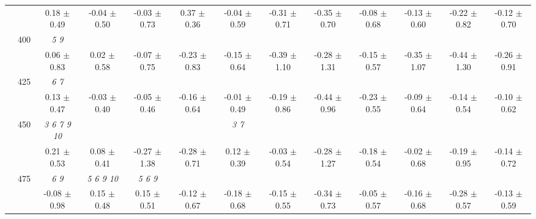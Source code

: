 \begin{table}[h]
{\begin{tabular}{
        ccccccccccccc}
 & & \cellcolor[HTML]{EFEFEF} 0.18 $\pm$ 0.49& \cellcolor[HTML]{EFEFEF} -0.04 $\pm$ 0.50& \cellcolor[HTML]{EFEFEF} -0.03 $\pm$ 0.73& \cellcolor[HTML]{EFEFEF} 0.37 $\pm$ 0.36& \cellcolor[HTML]{EFEFEF} -0.04 $\pm$ 0.59& \cellcolor[HTML]{EFEFEF} -0.31 $\pm$ 0.71& \cellcolor[HTML]{EFEFEF} -0.35 $\pm$ 0.70& \cellcolor[HTML]{EFEFEF} -0.08 $\pm$ 0.68& \cellcolor[HTML]{EFEFEF} -0.13 $\pm$ 0.60& \cellcolor[HTML]{EFEFEF} -0.22 $\pm$ 0.82& \cellcolor[HTML]{EFEFEF} -0.12 $\pm$ 0.70 \\ 
 & \multirow{2}{*}{400}& \textit{ 5 9 }& & & & & & & & & &  \\ 
 & & 0.06 $\pm$ 0.83& 0.02 $\pm$ 0.58& -0.07 $\pm$ 0.75& -0.23 $\pm$ 0.83& -0.15 $\pm$ 0.64& -0.39 $\pm$ 1.10& -0.28 $\pm$ 1.31& -0.15 $\pm$ 0.57& -0.35 $\pm$ 1.07& -0.44 $\pm$ 1.30& -0.26 $\pm$ 0.91 \\ 
 & \multirow{2}{*}{425}& \cellcolor[HTML]{EFEFEF} \textit{ 6 7 }& \cellcolor[HTML]{EFEFEF} & \cellcolor[HTML]{EFEFEF} & \cellcolor[HTML]{EFEFEF} & \cellcolor[HTML]{EFEFEF} & \cellcolor[HTML]{EFEFEF} & \cellcolor[HTML]{EFEFEF} & \cellcolor[HTML]{EFEFEF} & \cellcolor[HTML]{EFEFEF} & \cellcolor[HTML]{EFEFEF} & \cellcolor[HTML]{EFEFEF}  \\ 
 & & \cellcolor[HTML]{EFEFEF} 0.13 $\pm$ 0.47& \cellcolor[HTML]{EFEFEF} -0.03 $\pm$ 0.40& \cellcolor[HTML]{EFEFEF} -0.05 $\pm$ 0.46& \cellcolor[HTML]{EFEFEF} -0.16 $\pm$ 0.64& \cellcolor[HTML]{EFEFEF} -0.01 $\pm$ 0.49& \cellcolor[HTML]{EFEFEF} -0.19 $\pm$ 0.86& \cellcolor[HTML]{EFEFEF} -0.44 $\pm$ 0.96& \cellcolor[HTML]{EFEFEF} -0.23 $\pm$ 0.55& \cellcolor[HTML]{EFEFEF} -0.09 $\pm$ 0.64& \cellcolor[HTML]{EFEFEF} -0.14 $\pm$ 0.54& \cellcolor[HTML]{EFEFEF} -0.10 $\pm$ 0.62 \\ 
 & \multirow{2}{*}{450}& \textit{  3  6  7  9 10 }& & & & \textit{ 3 7 }& & & & & &  \\ 
 & & 0.21 $\pm$ 0.53& 0.08 $\pm$ 0.41& -0.27 $\pm$ 1.38& -0.28 $\pm$ 0.71& 0.12 $\pm$ 0.39& -0.03 $\pm$ 0.54& -0.28 $\pm$ 1.27& -0.18 $\pm$ 0.54& -0.02 $\pm$ 0.68& -0.19 $\pm$ 0.95& -0.14 $\pm$ 0.72 \\ 
 & \multirow{2}{*}{475}& \cellcolor[HTML]{EFEFEF} \textit{ 6 9 }& \cellcolor[HTML]{EFEFEF} \textit{  5  6  9 10 }& \cellcolor[HTML]{EFEFEF} \textit{ 5 6 9 }& \cellcolor[HTML]{EFEFEF} & \cellcolor[HTML]{EFEFEF} & \cellcolor[HTML]{EFEFEF} & \cellcolor[HTML]{EFEFEF} & \cellcolor[HTML]{EFEFEF} & \cellcolor[HTML]{EFEFEF} & \cellcolor[HTML]{EFEFEF} & \cellcolor[HTML]{EFEFEF}  \\ 
 & & \cellcolor[HTML]{EFEFEF} -0.08 $\pm$ 0.98& \cellcolor[HTML]{EFEFEF} 0.15 $\pm$ 0.48& \cellcolor[HTML]{EFEFEF} 0.15 $\pm$ 0.51& \cellcolor[HTML]{EFEFEF} -0.12 $\pm$ 0.67& \cellcolor[HTML]{EFEFEF} -0.18 $\pm$ 0.68& \cellcolor[HTML]{EFEFEF} -0.15 $\pm$ 0.55& \cellcolor[HTML]{EFEFEF} -0.34 $\pm$ 0.73& \cellcolor[HTML]{EFEFEF} -0.05 $\pm$ 0.57& \cellcolor[HTML]{EFEFEF} -0.16 $\pm$ 0.68& \cellcolor[HTML]{EFEFEF} -0.28 $\pm$ 0.57& \cellcolor[HTML]{EFEFEF} -0.13 $\pm$ 0.59 \\ 

\end{tabular}}
\end{table}
